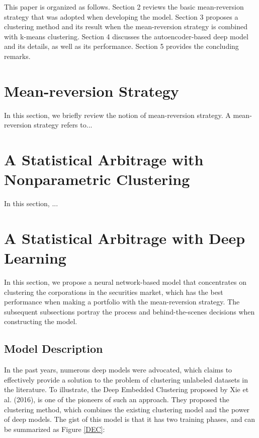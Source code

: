 \documentclass[11pt]{article}
\begin{document}
This paper is organized as follows. Section 2 reviews the basic mean-reversion strategy that was adopted when developing the model. Section 3 proposes a clustering method and its result when the mean-reversion strategy is combined with k-means clustering. Section 4 discusses the autoencoder-based deep model and its details, as well as its performance. Section 5 provides the concluding remarks.





\section{Mean-reversion Strategy}
In this section, we briefly review the notion of mean-reversion strategy. A mean-reversion strategy refers to...





\section{A Statistical Arbitrage with Nonparametric Clustering}
In this section, ...



\section{A Statistical Arbitrage with Deep Learning}
In this section, we propose a neural network-based model that concentrates on clustering the corporations in the securities market, which has the best performance when making a portfolio with the mean-reversion strategy. The subsequent subsections portray the process and behind-the-scenes decisions when constructing the model.

\subsection{Model Description}
In the past years, numerous deep models were advocated, which claims to effectively provide a solution to the problem of clustering unlabeled datasets in the literature. To illustrate, the Deep Embedded Clustering proposed by Xie et al. (2016), is one of the pioneers of such an approach. They proposed the clustering method, which combines the existing clustering model and the power of deep models. The gist of this model is that it has two training phases, and can be summarized as Figure \ref{DEC}: 
\end{document}
